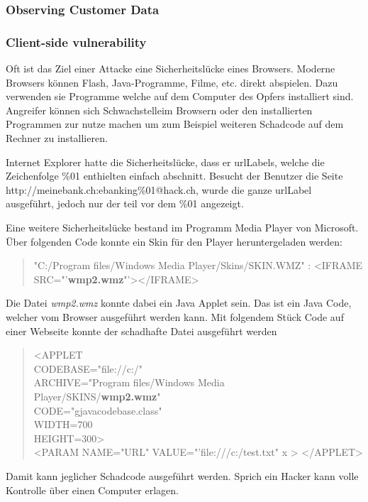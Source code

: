 \subsubsection{Observing Customer Data}


\subsubsection{Client-side vulnerability}
Oft ist das Ziel einer Attacke eine Sicherheitslücke eines Browsers. Moderne Browsers können Flash, Java-Programme, Filme, etc. direkt abspielen. Dazu verwenden sie Programme welche auf dem Computer des Opfers installiert sind. Angreifer können sich Schwachstelleim Browsern oder den installierten Programmen zur nutze machen um zum Beispiel weiteren Schadcode auf dem Rechner zu installieren. 

Internet Explorer hatte die Sicherheitslücke, dass er \Glspl{urlLabel}, welche die Zeichenfolge \%01 enthielten einfach abschnitt. Besucht der Benutzer die Seite \\
http://meinebank.ch:ebanking\%01@hack.ch, wurde die ganze \Gls{urlLabel} ausgeführt, jedoch nur der teil vor dem \%01 angezeigt.

Eine weitere Sicherheitslücke bestand im Programm Media Player von Microsoft. Über folgenden Code konnte ein Skin für den Player heruntergeladen werden:
\begin{quote}
"C:/Program files/Windows Media Player/Skins/SKIN.WMZ" : <IFRAME
SRC="'\textbf{wmp2.wmz}"'></IFRAME>
\end{quote}

Die Datei \textit{wmp2.wmz} konnte dabei ein Java Applet sein. Das ist ein Java Code, welcher vom Browser ausgeführt werden kann. Mit folgendem Stück Code auf einer Webseite konnte der schadhafte Datei ausgeführt werden
\begin{quote}
<APPLET \\
  CODEBASE="file://c:/" \\
  ARCHIVE="Program files/Windows Media\\
  Player/SKINS/\textbf{wmp2.wmz}"\\
  CODE="gjavacodebase.class" \\
  WIDTH=700 \\
  HEIGHT=300>\\
  <PARAM NAME="URL" VALUE="'file:///c:/test.txt" x >
</APPLET>
\end{quote}
Damit kann jeglicher Schadcode ausgeführt werden. Sprich ein Hacker kann volle Kontrolle über einen Computer erlagen.

